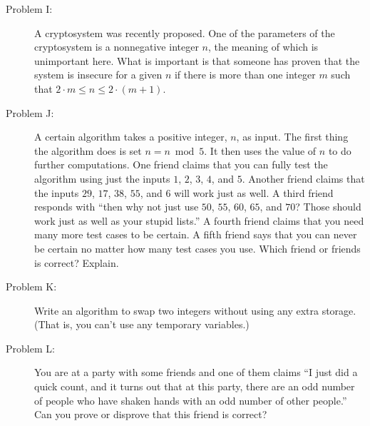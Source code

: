 \begin{description}
\item[Problem I:]
A cryptosystem was recently proposed.  
One of the parameters of the cryptosystem is a nonnegative integer $n$, 
the meaning of which is unimportant here.  
What is important is that someone has proven that the system is insecure for 
a given $n$ if there is more than one integer $m$ such that $2\cdot m \leq n \leq 2\cdot (m+1)$. 



\item[Problem J:]
A certain algorithm takes a positive integer, $n$, as input.
The first thing the algorithm does is set $n=n\bmod 5$. 
It then uses the value of $n$ to do further computations.
One friend claims that you can fully test the algorithm using just the
inputs $1$, $2$, $3$, $4$, and $5$.  Another friend claims that the
inputs $29$, $17$, $38$, $55$, and $6$ will work just as well.
A third friend responds with ``then why not just use $50$, $55$, $60$, $65$, and $70$?
Those should work just as well as your stupid lists.''
A fourth friend claims that you need many more test cases to be certain.
A fifth friend says that you can never be certain no matter how many test
cases you use.  Which friend or friends is correct?  Explain.


\item[Problem K:]
Write an algorithm to swap two integers without using any extra storage.
(That is, you can't use any temporary variables.)



\item[Problem L:]
You are at a party with some friends and one of them claims 
``I just did a quick count, and it turns out that at this party,
there are an odd number of people who have shaken hands with an odd number of other people.''
Can you prove or disprove that this friend is correct?




\end{description}
